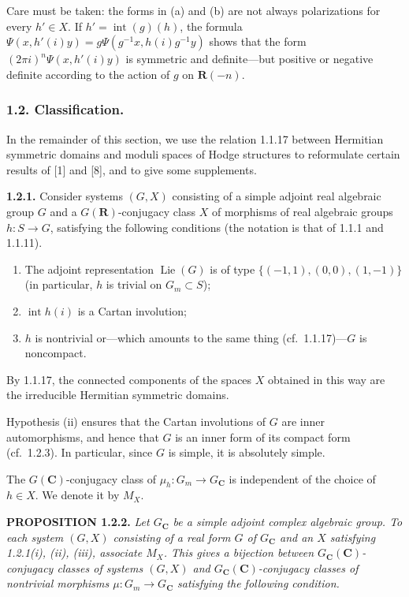 \documentclass[10pt,a4paper]{article}
\newcommand{\SourcePage}[2]{\clearpage\setcounter{page}{#2}\typeout{D031_SOURCE_PAGE physical=#1 printed=#2}}
\begin{document}
\SourcePage{11}{257}
Care must be taken: the forms in (a) and (b) are not always polarizations for every \(h'\in X\). If \(h'=\operatorname{int}(g)(h)\), the formula \(\Psi(x,h'(i)y)=g\Psi(g^{-1}x,h(i)g^{-1}y)\) shows that the form \((2\pi i)^n\Psi(x,h'(i)y)\) is symmetric and definite---but positive or negative definite according to the action of \(g\) on \(\mathbf R(-n)\).

\subsubsection{1.2. Classification.}

In the remainder of this section, we use the relation 1.1.17 between Hermitian symmetric domains and moduli spaces of Hodge structures to reformulate certain results of {[}1{]} and {[}8{]}, and to give some supplements.

\textbf{1.2.1.} Consider systems \((G,X)\) consisting of a simple adjoint real algebraic group \(G\) and a \(G(\mathbf R)\)-conjugacy class \(X\) of morphisms of real algebraic groups \(h:S\to G\), satisfying the following conditions (the notation is that of 1.1.1 and 1.1.11).

\begin{enumerate}
\def\labelenumi{(\roman{enumi})}
\item
  The adjoint representation \(\operatorname{Lie}(G)\) is of type \(\{(-1,1),(0,0),(1,-1)\}\) (in particular, \(h\) is trivial on \(G_m\subset S\));
\item
  \(\operatorname{int}h(i)\) is a Cartan involution;
\item
  \(h\) is nontrivial or---which amounts to the same thing (cf.~1.1.17)---\(G\) is noncompact.
\end{enumerate}

By 1.1.17, the connected components of the spaces \(X\) obtained in this way are the irreducible Hermitian symmetric domains.

Hypothesis (ii) ensures that the Cartan involutions of \(G\) are inner automorphisms, and hence that \(G\) is an inner form of its compact form (cf.~1.2.3). In particular, since \(G\) is simple, it is absolutely simple.

The \(G(\mathbf C)\)-conjugacy class of \(\mu_h:G_m\to G_{\mathbf C}\) is independent of the choice of \(h\in X\). We denote it by \(M_X\).

\textbf{PROPOSITION 1.2.2.} \emph{Let \(G_{\mathbf C}\) be a simple adjoint complex algebraic group. To each system \((G,X)\) consisting of a real form \(G\) of \(G_{\mathbf C}\) and an \(X\) satisfying 1.2.1(i), (ii), (iii), associate \(M_X\). This gives a bijection between \(G_{\mathbf C}(\mathbf C)\)-conjugacy classes of systems \((G,X)\) and \(G_{\mathbf C}(\mathbf C)\)-conjugacy classes of nontrivial morphisms \(\mu:G_m\to G_{\mathbf C}\) satisfying the following condition.}
\end{document}
